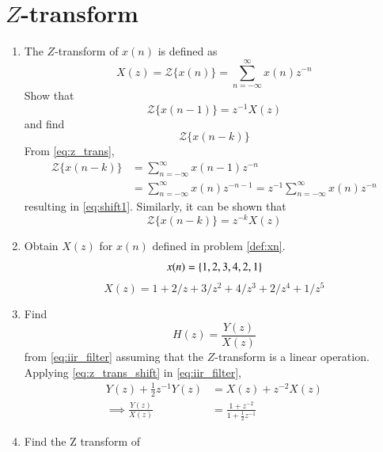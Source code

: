 \documentclass[journal,12pt,twocolumn]{IEEEtran}
\renewcommand\thesection{\arabic{section}}
\begin{document}
\section{$Z$-transform}
\begin{enumerate}[label=\thesection.\arabic*]
\item The $Z$-transform of $x(n)$ is defined as
%
\begin{equation}
\label{eq:z_trans}
X(z)={\mathcal {Z}}\{x(n)\}=\sum _{n=-\infty }^{\infty }x(n)z^{-n}
\end{equation}
%
Show that
\begin{equation}
\label{eq:shift1}
{\mathcal {Z}}\{x(n-1)\} = z^{-1}X(z)
\end{equation}
and find
\begin{equation}
	{\mathcal {Z}}\{x(n-k)\} 
\end{equation}
\solution From \eqref{eq:z_trans},
\begin{align}
{\mathcal {Z}}\{x(n-k)\} &=\sum _{n=-\infty }^{\infty }x(n-1)z^{-n}
\\
&=\sum _{n=-\infty }^{\infty }x(n)z^{-n-1} = z^{-1}\sum _{n=-\infty }^{\infty }x(n)z^{-n}
\end{align}
resulting in \eqref{eq:shift1}. Similarly, it can be shown that
%
\begin{equation}
\label{eq:z_trans_shift}
	{\mathcal {Z}}\{x(n-k)\} = z^{-k}X(z)
\end{equation}
\item Obtain $X(z)$ for $x(n)$ defined in problem 
	\ref{def:xn}.
\solution
\begin{equation}
x(n) = \left\{1,2,3,4,2,1\right\}
\end{equation}
\begin{equation}
    X(z) = 1 + 2/z + 3/z^2 + 4/z^3 + 2/z^4 + 1/z^5
\end{equation}
\item Find
%
\begin{equation}
H(z) = \frac{Y(z)}{X(z)}
\end{equation}
%
from  \eqref{eq:iir_filter} assuming that the $Z$-transform is a linear operation.
\\
\solution  Applying \eqref{eq:z_trans_shift} in \eqref{eq:iir_filter},
\begin{align}
Y(z) + \frac{1}{2}z^{-1}Y(z) &= X(z)+z^{-2}X(z)
\\
\implies \frac{Y(z)}{X(z)} &= \frac{1 + z^{-2}}{1 + \frac{1}{2}z^{-1}}
\label{eq:freq_resp}
\end{align}
%
\item Find the Z transform of 

\end{enumerate}
\end{document}
